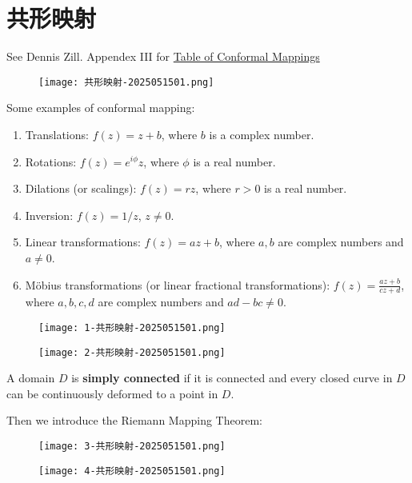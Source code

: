 \section{共形映射}

See Dennis Zill. Appendex III for \underline{Table of Conformal Mappings}

\begin{figure}[H]
\centering
\texttt{[image: 共形映射-2025051501.png]}
\label{}
\end{figure}
Some examples of conformal mapping:

\begin{enumerate}
	\item Translations: $f(z) = z + b$, where $b$ is a complex number.
	\item Rotations: $f(z) = e^{i\phi} z$, where $\phi$ is a real number.
	\item Dilations (or scalings): $f(z) = rz$, where $r > 0$ is a real number.
	\item Inversion: $f(z) = 1/z$, $z \neq 0$.
	\item Linear transformations: $f(z) = az + b$, where $a, b$ are complex numbers and $a \neq 0$.
	\item Möbius transformations (or linear fractional transformations): $f(z) = \frac{az + b}{cz + d}$, where $a, b, c, d$ are complex numbers and $ad - bc \neq 0$.
\end{enumerate}

\begin{figure}[H]
\centering
\texttt{[image: 1-共形映射-2025051501.png]}
\label{}
\end{figure}
\begin{figure}[H]
\centering
\texttt{[image: 2-共形映射-2025051501.png]}
\label{}
\end{figure}

\begin{definition}
A domain $D$ is \textbf{simply connected} if it is connected and every closed curve in $D$ can be continuously deformed to a point in $D$.
\end{definition}
Then we introduce the Riemann Mapping Theorem:
\begin{figure}[H]
\centering
\texttt{[image: 3-共形映射-2025051501.png]}
\label{}
\end{figure}

\begin{figure}[H]
\centering
\texttt{[image: 4-共形映射-2025051501.png]}
\label{}
\end{figure}

